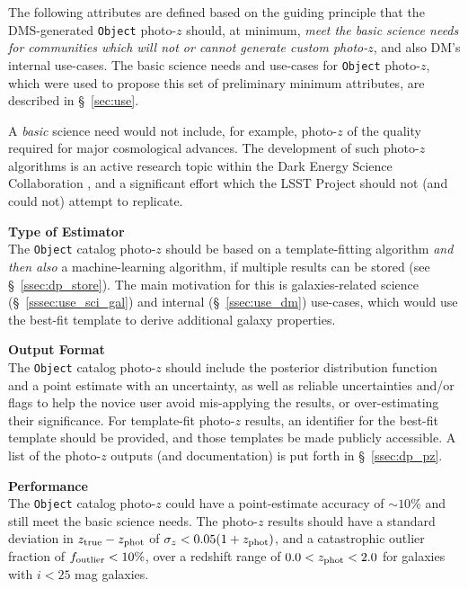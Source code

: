\documentclass[DM,lsstdraft,toc]{lsstdoc}
\begin{document}
The following attributes are defined based on the guiding principle that the DMS-generated {\tt Object} photo-$z$ should, at minimum, {\it meet the basic science needs for communities which will not or cannot generate custom photo-$z$}, and also DM's internal use-cases.
The basic science needs and use-cases for {\tt Object} photo-$z$, which were used to propose this set of preliminary minimum attributes, are described in \S~\ref{sec:use}.

A {\it basic} science need would not include, for example, photo-$z$ of the quality required for major cosmological advances.
The development of such photo-$z$ algorithms is an active research topic within the Dark Energy Science Collaboration \citep{2018arXiv180901669T}, and a significant effort which the LSST Project should not (and could not) attempt to replicate. 

{\bf Type of Estimator}\\
The {\tt Object} catalog photo-$z$ should be based on a template-fitting algorithm {\it and then also} a machine-learning algorithm, if multiple results can be stored (see \S~\ref{ssec:dp_store}).
The main motivation for this is galaxies-related science (\S~\ref{sssec:use_sci_gal}) and internal (\S~\ref{ssec:use_dm}) use-cases, which would use the best-fit template to derive additional galaxy properties.

{\bf Output Format}\\
The {\tt Object} catalog photo-$z$ should include the posterior distribution function and a point estimate with an uncertainty, as well as reliable uncertainties and/or flags to help the novice user avoid mis-applying the results, or over-estimating their significance.
For template-fit photo-$z$ results, an identifier for the best-fit template should be provided, and those templates be made publicly accessible.
A list of the photo-$z$ outputs (and documentation) is put forth in \S~\ref{ssec:dp_pz}.

{\bf Performance}\\
The {\tt Object} catalog photo-$z$ could have a point-estimate accuracy of $\sim10\%$ and still meet the basic science needs.
The photo-$z$ results should have a standard deviation in $z_{\rm true}-z_{\rm phot}$ of $\sigma_z < 0.05(1+z_{\rm phot})$, and a catastrophic outlier fraction of $f_{\rm outlier} < 10\%$, over a redshift range of $0.0 < z_{\rm phot} < 2.0$ for galaxies with $i<25$ mag galaxies.



\clearpage
\end{document}
